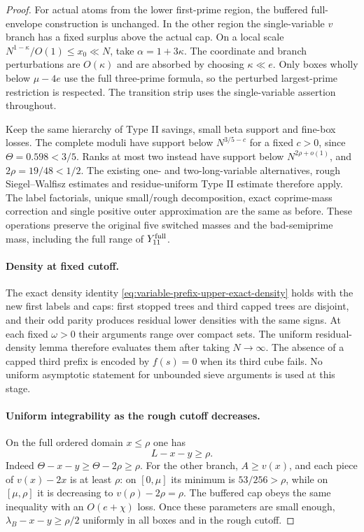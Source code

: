 \documentclass[11pt]{article}
\begin{document}
\begin{proof}
For actual atoms from the lower first-prime region, the buffered
full-envelope construction is unchanged. In the other region the
single-variable $v$ branch has a fixed surplus above the actual
cap. On a local scale $N^{1-\kappa}/O(1)\le x_0\ll N$, take
$\alpha=1+3\kappa$. The coordinate and branch perturbations are
$O(\kappa)$ and are absorbed by choosing $\kappa\ll e$.
Only boxes wholly below $\mu-4e$ use the full three-prime
formula, so the perturbed largest-prime restriction is respected.
The transition strip uses the single-variable assertion throughout.

Keep the same hierarchy of Type II savings, small beta support
and fine-box losses. The complete moduli have support below
$N^{3/5-c}$ for a fixed $c>0$, since $\Theta=0.598<3/5$.
Ranks at most two instead have support below
$N^{2\rho+o(1)}$, and $2\rho=19/48<1/2$.
The existing one- and two-long-variable alternatives, rough
Siegel--Walfisz estimates and residue-uniform Type II estimate
therefore apply. The label factorials, unique small/rough
decomposition, exact coprime-mass correction and single positive
outer approximation are the same as before. These operations
preserve the original five switched masses and the bad-semiprime
mass, including the full range of $Y_{11}^{\rm full}$.

\paragraph{Density at fixed cutoff.}
The exact density identity
\eqref{eq:variable-prefix-upper-exact-density} holds with the
new first labels and caps: first stopped trees and third capped
trees are disjoint, and their odd parity produces residual lower
densities with the same signs. At each fixed $\omega>0$ their
arguments range over compact sets. The uniform residual-density
lemma therefore evaluates them after taking $N\to\infty$.
The absence of a capped third prefix is encoded by $f(s)=0$
when its third cube fails. No uniform asymptotic statement for
unbounded sieve arguments is used at this stage.

\paragraph{Uniform integrability as the rough cutoff decreases.}
On the full ordered domain $x\le\rho$ one has
\begin{equation}\label{eq:extended-prefix-residual-margin}
 L-x-y\ge\rho.
\end{equation}
Indeed $\Theta-x-y\ge\Theta-2\rho\ge\rho$. For the other
branch, $A\ge v(x)$, and each piece of $v(x)-2x$ is at least
$\rho$: on $[0,\mu]$ its minimum is $53/256>\rho$, while on
$[\mu,\rho]$ it is decreasing to
$v(\rho)-2\rho=\rho$.
The buffered cap obeys the same inequality with an
$O(e+\chi)$ loss. Once these parameters are small enough,
$\lambda_B-x-y\ge\rho/2$ uniformly in all boxes and in
the rough cutoff.


\end{proof}
\end{document}
